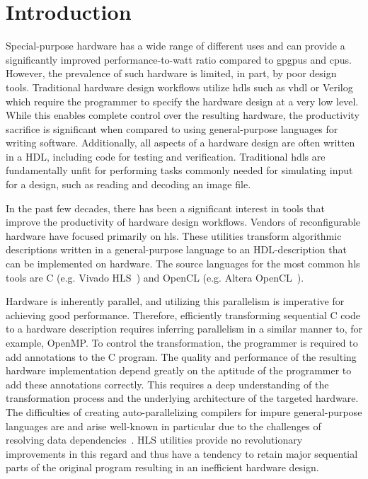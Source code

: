 \chapter{Introduction}

Special-purpose hardware has a wide range of different uses and can provide a
significantly improved performance-to-watt ratio compared to \glspl{gpgpu} and
\glspl{cpu}. However, the prevalence of such hardware is limited, in part, by
poor design tools. Traditional hardware design workflows utilize
\glspl{hdl} such as \gls{vhdl} or Verilog
which require the programmer to specify the hardware design at a very low
level. While this enables complete control over the resulting hardware, the
productivity sacrifice is significant when compared to using general-purpose
languages for writing software. Additionally, all aspects of a hardware design
are often written in a HDL, including code for testing and
verification. Traditional \glspl{hdl} are fundamentally unfit for performing tasks
commonly needed for simulating input for a design, such as reading and decoding
an image file.%

In the past few decades, there has been a significant interest in tools that
improve the productivity of hardware design workflows. Vendors of reconfigurable
hardware have focused primarily on \gls{hls}. These
utilities transform algorithmic descriptions written in a general-purpose
language to an HDL-description that can be implemented on hardware. The source
languages for the most common \gls{hls} tools are C (e.g. Vivado HLS~\cite{vivadohls})
and OpenCL (e.g. Altera OpenCL~\cite{aocl}).

Hardware is inherently parallel, and utilizing this parallelism is imperative
for achieving good performance. Therefore, efficiently transforming sequential C
code to a hardware description requires inferring parallelism in a similar
manner to, for example, OpenMP. To control the transformation, the programmer is
required to add annotations to the C program. The quality and performance of the
resulting hardware implementation depend greatly on the aptitude of the
programmer to add these annotations correctly. This requires a deep
understanding of the transformation process and the underlying architecture of
the targeted hardware. The difficulties of creating auto-parallelizing compilers
for impure general-purpose languages are and arise well-known in particular due
to the challenges of resolving data
dependencies~\cite{banerjee1976data,bodik2000abcd}. HLS utilities provide no
revolutionary improvements in this regard and thus have a tendency to retain
major sequential parts of the original program resulting in an inefficient
hardware design.

